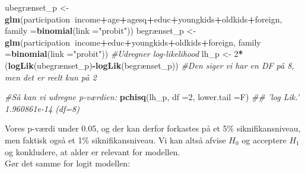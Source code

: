 \documentclass[
  10pt,
]{article}
\newenvironment{Shaded}{\begin{snugshade}}{\end{snugshade}}
\newcommand{\CommentTok}[1]{\textcolor[rgb]{0.56,0.35,0.01}{\textit{#1}}}
\newcommand{\DataTypeTok}[1]{\textcolor[rgb]{0.13,0.29,0.53}{#1}}
\newcommand{\DecValTok}[1]{\textcolor[rgb]{0.00,0.00,0.81}{#1}}
\newcommand{\KeywordTok}[1]{\textcolor[rgb]{0.13,0.29,0.53}{\textbf{#1}}}
\newcommand{\NormalTok}[1]{#1}
\newcommand{\OperatorTok}[1]{\textcolor[rgb]{0.81,0.36,0.00}{\textbf{#1}}}
\newcommand{\StringTok}[1]{\textcolor[rgb]{0.31,0.60,0.02}{#1}}
\begin{document}
\begin{Shaded}
\begin{Highlighting}[]
\NormalTok{ubegrænset_p <-}\StringTok{ }\KeywordTok{glm}\NormalTok{(participation}\OperatorTok{~}\NormalTok{income}\OperatorTok{+}\NormalTok{age}\OperatorTok{+}\NormalTok{agesq}\OperatorTok{+}\NormalTok{educ}\OperatorTok{+}\NormalTok{youngkids}\OperatorTok{+}\NormalTok{oldkids}\OperatorTok{+}\NormalTok{foreign,}
                    \DataTypeTok{family =}\KeywordTok{binomial}\NormalTok{(}\DataTypeTok{link =}\StringTok{"probit"}\NormalTok{))}
\NormalTok{begrænset_p <-}\StringTok{ }\KeywordTok{glm}\NormalTok{(participation}\OperatorTok{~}\NormalTok{income}\OperatorTok{+}\NormalTok{educ}\OperatorTok{+}\NormalTok{youngkids}\OperatorTok{+}\NormalTok{oldkids}\OperatorTok{+}\NormalTok{foreign,}
                   \DataTypeTok{family =}\KeywordTok{binomial}\NormalTok{(}\DataTypeTok{link =}\StringTok{"probit"}\NormalTok{))}
\CommentTok{#Udregner log-likelihood}
\NormalTok{lh_p <-}\StringTok{ }\DecValTok{2}\OperatorTok{*}\NormalTok{(}\KeywordTok{logLik}\NormalTok{(ubegrænset_p)}\OperatorTok{-}\KeywordTok{logLik}\NormalTok{(begrænset_p))}
\CommentTok{#Den siger vi har en DF på 8, men det er reelt kun på 2}

\CommentTok{#Så kan vi udregne p-værdien: }
\KeywordTok{pchisq}\NormalTok{(lh_p, }\DataTypeTok{df =}\DecValTok{2}\NormalTok{, }\DataTypeTok{lower.tail =}\NormalTok{F)}
\CommentTok{## 'log Lik.' 1.960861e-14 (df=8)}
\end{Highlighting}
\end{Shaded}

Vores p-værdi under 0.05, og der kan derfor forkastes på et 5\%
siknifikansniveau, men faktisk også et 1\% siknifikansniveau. Vi kan
altså afvise \(H_0\) og acceptere \(H_1\) og konkludere, at alder er
relevant for modellen.\\
Gør det samme for logit modellen:
\end{document}

